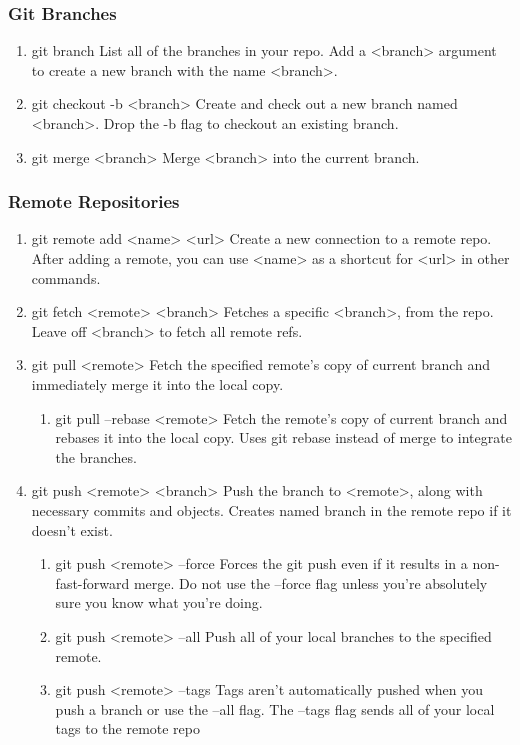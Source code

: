 \documentclass[11pt]{article}
\begin{document}
\subsubsection{Git Branches}
\label{sec-1-1-4}
\begin{enumerate}
\item git branch
\label{sec-1-1-4-1}
List all of the branches in your repo. Add a <branch> argument to
create a new branch with the name <branch>.
\item git checkout -b <branch>
\label{sec-1-1-4-2}
Create and check out a new branch named <branch>. Drop the -b
flag to checkout an existing branch.
\item git merge <branch>
\label{sec-1-1-4-3}
Merge <branch> into the current branch.
\end{enumerate}
\subsubsection{Remote Repositories}
\label{sec-1-1-5}
\begin{enumerate}
\item git remote add <name> <url>
\label{sec-1-1-5-1}
Create a new connection to a remote repo. After adding a remote,
you can use <name> as a shortcut for <url> in other commands.
\item git fetch <remote> <branch>
\label{sec-1-1-5-2}
Fetches a specific <branch>, from the repo. Leave off <branch> to
fetch all remote refs.
\item git pull <remote>
\label{sec-1-1-5-3}
Fetch the specified remote’s copy of current branch and immediately
merge it into the local copy.
\begin{enumerate}
\item git pull --rebase <remote>
\label{sec-1-1-5-3-1}
Fetch the remote’s copy of current branch and rebases it into the local
copy. Uses git rebase instead of merge to integrate the branches.
\end{enumerate}
\item git push <remote> <branch>
\label{sec-1-1-5-4}
Push the branch to <remote>, along with necessary commits and
objects. Creates named branch in the remote repo if it doesn’t exist.
\begin{enumerate}
\item git push <remote> --force
\label{sec-1-1-5-4-1}
Forces the git push even if it results in a non-fast-forward merge. Do not use
the --force flag unless you’re absolutely sure you know what you’re doing.
\item git push <remote> --all
\label{sec-1-1-5-4-2}
Push all of your local branches to the specified remote.
\item git push <remote> --tags
\label{sec-1-1-5-4-3}
Tags aren’t automatically pushed when you push a branch or use the
--all flag. The --tags flag sends all of your local tags to the remote repo
\end{enumerate}
\end{enumerate}
\end{document}
